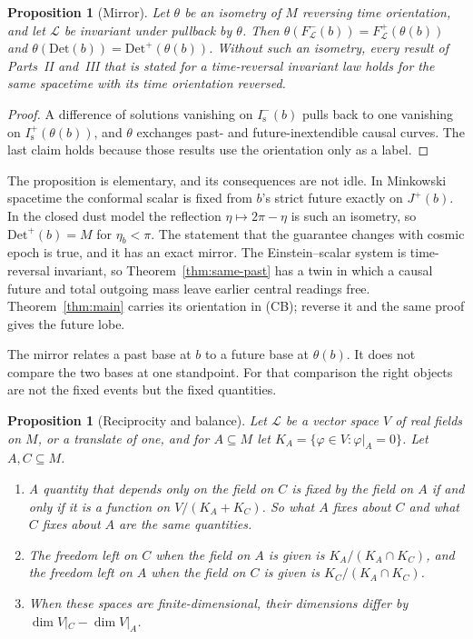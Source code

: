 \documentclass[11pt]{article}
\newtheorem{proposition}[theorem]{Proposition}
\theoremstyle{definition}
\newcommand{\Jp}{J^{+}}
\newcommand{\Is}{I^-_{\mathrm s}}
\newcommand{\Isp}{I^+_{\mathrm s}}
\newcommand{\Det}{\mathrm{Det}}
\begin{document}
\begin{proposition}[Mirror]\label{prop:mirror}
Let $\theta$ be an isometry of $M$ reversing time orientation, and let $\mathcal L$ be invariant under pullback by $\theta$. Then $\theta(F^-_{\mathcal L}(b))=F^+_{\mathcal L}(\theta(b))$ and $\theta(\Det(b))=\Det^+(\theta(b))$. Without such an isometry, every result of Parts~II and~III that is stated for a time-reversal invariant law holds for the same spacetime with its time orientation reversed.
\end{proposition}

\begin{proof}
A difference of solutions vanishing on $\Is(b)$ pulls back to one vanishing on $\Isp(\theta(b))$, and $\theta$ exchanges past- and future-inextendible causal curves. The last claim holds because those results use the orientation only as a label.
\end{proof}

The proposition is elementary, and its consequences are not idle. In Minkowski spacetime the conformal scalar is fixed from $b$'s strict future exactly on $\Jp(b)$. In the closed dust model the reflection $\eta\mapsto2\pi-\eta$ is such an isometry, so $\Det^+(b)=M$ for $\eta_b<\pi$. The statement that the guarantee changes with cosmic epoch is true, and it has an exact mirror. The Einstein--scalar system is time-reversal invariant, so Theorem~\ref{thm:same-past} has a twin in which a causal future and total outgoing mass leave earlier central readings free. Theorem~\ref{thm:main} carries its orientation in (CB); reverse it and the same proof gives the future lobe.

The mirror relates a past base at $b$ to a future base at $\theta(b)$. It does not compare the two bases at one standpoint. For that comparison the right objects are not the fixed events but the fixed quantities.

\begin{proposition}[Reciprocity and balance]\label{prop:balance}
Let $\mathcal L$ be a vector space $V$ of real fields on $M$, or a translate of one, and for $A\subseteq M$ let $K_A=\{\varphi\in V:\varphi|_A=0\}$. Let $A,C\subseteq M$.
\begin{enumerate}
\item A quantity that depends only on the field on $C$ is fixed by the field on $A$ if and only if it is a function on $V/(K_A+K_C)$. So what $A$ fixes about $C$ and what $C$ fixes about $A$ are the same quantities.
\item The freedom left on $C$ when the field on $A$ is given is $K_A/(K_A\cap K_C)$, and the freedom left on $A$ when the field on $C$ is given is $K_C/(K_A\cap K_C)$.
\item When these spaces are finite-dimensional, their dimensions differ by $\dim V|_C-\dim V|_A$.
\end{enumerate}
\end{proposition}
\end{document}
